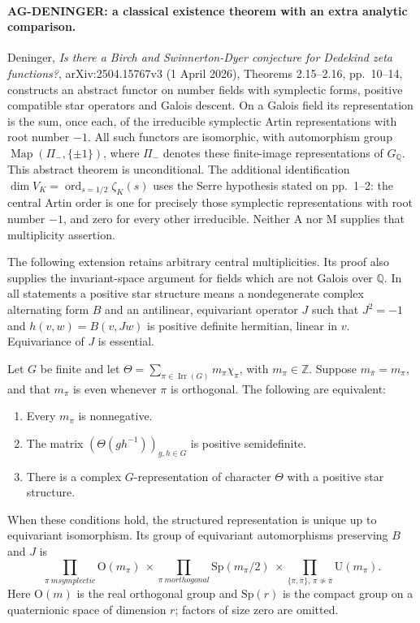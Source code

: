 \paragraph{AG-DENINGER: a classical existence theorem with an extra analytic comparison.}
Deninger, \emph{Is there a Birch and Swinnerton-Dyer conjecture for
Dedekind zeta functions?}, arXiv:2504.15767v3 (1 April 2026),
Theorems 2.15--2.16, pp.~10--14, constructs an abstract functor
on number fields with symplectic forms, positive compatible star
operators and Galois descent.  On a Galois field its representation
is the sum, once each, of the irreducible symplectic Artin
representations with root number $-1$.  All such functors are
isomorphic, with automorphism group
$\operatorname{Map}(\Pi_-,\{\pm1\})$, where $\Pi_-$ denotes
these finite-image representations of $G_{\mathbb Q}$.
This abstract theorem is unconditional.  The additional
identification
$\dim V_K=\operatorname{ord}_{s=1/2}\zeta_K(s)$ uses the
Serre hypothesis stated on pp.~1--2: the central Artin order
is one for precisely those symplectic representations with
root number $-1$, and zero for every other irreducible.
Neither A nor M supplies that multiplicity assertion.

The following extension retains arbitrary central multiplicities.
Its proof also supplies the invariant-space argument for fields
which are not Galois over $\mathbb Q$.  In all statements a
positive star structure means a nondegenerate complex alternating
form $B$ and an antilinear, equivariant operator $J$ such that
$J^2=-1$ and $h(v,w)=B(v,Jw)$ is positive definite hermitian,
linear in $v$.  Equivariance of $J$ is essential.

\begin{proposition}
Let $G$ be finite and let
$\Theta=\sum_{\pi\in\operatorname{Irr}(G)}m_\pi\chi_\pi$,
with $m_\pi\in\mathbb Z$.  Suppose
$m_{\bar\pi}=m_\pi$, and that $m_\pi$ is even whenever
$\pi$ is orthogonal.  The following are equivalent:
\begin{enumerate}
\item Every $m_\pi$ is nonnegative.
\item The matrix $(\Theta(gh^{-1}))_{g,h\in G}$ is positive
semidefinite.
\item There is a complex $G$-representation of character $\Theta$
with a positive star structure.
\end{enumerate}
When these conditions hold, the structured representation is
unique up to equivariant isomorphism.  Its group of equivariant
automorphisms preserving $B$ and $J$ is
\[
 \prod_{\pi\ {
m symplectic}}\mathrm O(m_\pi)
 \ \times\!
 \prod_{\pi\ {
m orthogonal}}\mathrm{Sp}(m_\pi/2)
 \ \times\!
 \prod_{\{\pi,\bar\pi\},\,\pi\not\simeq\bar\pi}
                              \mathrm U(m_\pi).          \tag{AG-central-groups}
\]
Here $\mathrm O(m)$ is the real orthogonal group and
$\mathrm{Sp}(r)$ is the compact group on a quaternionic space
of dimension $r$; factors of size zero are omitted.
\end{proposition}

